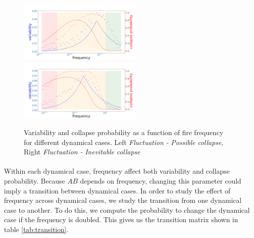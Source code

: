 \documentclass{article}
\begin{document}
\begin{figure}[h!]
\begin{center}
\includegraphics[width=6cm]{results/measures_fluctuation_possible.png} \includegraphics[width=6cm]{results/measures_fluctuation_inevitable.png}
\end{center}
\caption{\label{fig:vcp5}Variability and collapse probability as a function of fire frequency for different dynamical cases. Left \textit{Fluctuation - Possible collapse}, Right \textit{Fluctuation - Inevitable collapse}}
\end{figure}



\newpage
\label{transition}
\paragraph{}
Within each dynamical case, frequency affect both variability and collapse probability. Because $AB$ depends on frequency, changing this parameter could imply a transition between dynamical cases. In order to study the effect of frequency across dynamical cases, we study the transition from one dynamical case to another. To do this, we compute the probability to change the dynamical case if the frequency is doubled. This gives us the transition matrix shown in table \ref{tab:transition}.

\end{document}

